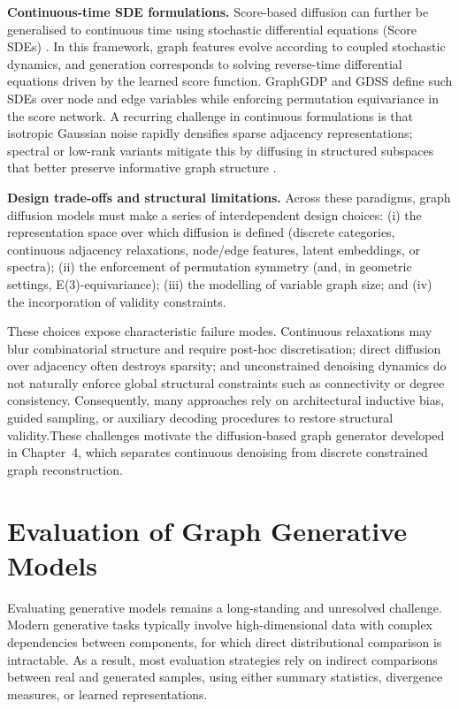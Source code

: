 \textbf{Continuous-time SDE formulations.}
Score-based diffusion can further be generalised to continuous time
using stochastic differential equations (Score SDEs)
\citep{song2020score}. In this framework, graph features evolve
according to coupled stochastic dynamics, and generation corresponds
to solving reverse-time differential equations driven by the learned
score function.
GraphGDP \citep{huang2022graphgdp} and GDSS \citep{jo2022gdss}
define such SDEs over node and edge variables while enforcing
permutation equivariance in the score network.
A recurring challenge in continuous formulations is that isotropic
Gaussian noise rapidly densifies sparse adjacency representations;
spectral or low-rank variants mitigate this by diffusing in
structured subspaces that better preserve informative graph structure
\citep{luo2023fast}.

\textbf{Design trade-offs and structural limitations.}
Across these paradigms, graph diffusion models must make a series
of interdependent design choices:
(i) the representation space over which diffusion is defined
(discrete categories, continuous adjacency relaxations, node/edge
features, latent embeddings, or spectra);
(ii) the enforcement of permutation symmetry (and, in geometric
settings, E(3)-equivariance);
(iii) the modelling of variable graph size; and
(iv) the incorporation of validity constraints.

These choices expose characteristic failure modes.
Continuous relaxations may blur combinatorial structure and require
post-hoc discretisation; direct diffusion over adjacency often
destroys sparsity; and unconstrained denoising dynamics do not
naturally enforce global structural constraints such as connectivity
or degree consistency.
Consequently, many approaches rely on architectural inductive bias,
guided sampling, or auxiliary decoding procedures to restore
structural validity.These challenges motivate the diffusion-based graph generator developed in
Chapter~4, which separates continuous denoising from discrete constrained
graph reconstruction.



\section{Evaluation of Graph Generative Models}
\label{sec:related:evaluation}

Evaluating generative models remains a long-standing and unresolved challenge.
Modern generative tasks typically involve high-dimensional data with complex dependencies
between components, for which direct distributional comparison is intractable.
As a result, most evaluation strategies rely on indirect comparisons between real and
generated samples, using either summary statistics, divergence measures, or learned
representations.

